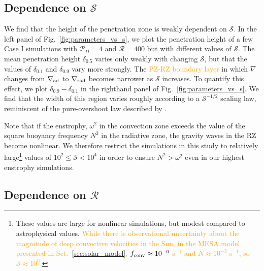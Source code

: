 \documentclass[twocolumn, linenumbers]{aastex631}
\newcommand{\gradrad}{\ensuremath{\nabla_{\rm{rad}}}}
\newcommand{\gradad}{\ensuremath{\nabla_{\rm{ad}}}}
\newcommand{\justgrad}{\ensuremath{\nabla}}
\newcommand{\mP}{\ensuremath{\mathcal{P}}}
\newcommand{\mR}{\ensuremath{\mathcal{R}}}
\newcommand{\mS}{\ensuremath{\mathcal{S}}}
\newcommand{\editone}[1]{\textcolor{orange}{#1}}
\begin{document}
\subsection{Dependence on $\mS$}

We find that the height of the penetration zone is weakly dependent on $\mS$.
In the left panel of Fig.~\ref{fig:parameters_vs_s}, we plot the penetration height of a few Case I simulations with $\mP_D = 4$ and $\mR = 400$ but with different values of $\mS$.
The mean penetration height $\delta_{0.5}$ varies only weakly with changing $\mS$, but that the values of $\delta_{0.1}$ and $\delta_{0.9}$ vary more strongly.
The \editone{PZ-RZ boundary layer} in which $\justgrad$ changes from $\gradad$ to $\gradrad$ becomes narrower as $\mS$ increases.
To quantify this effect, we plot $\delta_{0.9} - \delta_{0.1}$ in the righthand panel of Fig.~\ref{fig:parameters_vs_s}.
We find that the width of this region varies roughly according to a $\mS^{-1/2}$ scaling law, reminiscent of the pure-overshoot law described by \citet{korre_etal_2019}.

Note that if the enstrophy, $\omega^2$ in the convection zone exceeds the value of the square buoyancy frequency $N^2$ in the radiative zone, the gravity waves in the RZ become nonlinear.
We therefore restrict the simulations in this study to relatively large\footnote{These values are large for nonlinear simulations, but modest compared to astrophysical values. \editone{While there is observational uncertainty about the magnitude of deep convective velocities in the Sun, in the MESA model presented in Sct.~\ref{sec:solar_model}, $f_{\rm{conv}} \approx 10^{-6}$ s$^{-1}$ and $N \approx 10^{-3}$ s$^{-1}$, so $\mS \approx 10^6$.}} values of $10^{2} \leq \mS < 10^4$ in order to ensure $N^2 > \omega^2$ even in our highest enstrophy simulations.



\subsection{Dependence on $\mR$}
\end{document}
